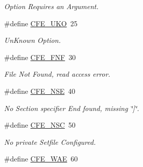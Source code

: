 \begin{CompactItemize}
\begin{CompactList}\small\item\em Option Requires an Argument. \item\end{CompactList}\item 
\hypertarget{group__errors_g77e1698381143e412a7a4796b2b8f564}{
\#define \hyperlink{group__errors_g77e1698381143e412a7a4796b2b8f564}{CFE\_\-UKO}~25}
\label{group__errors_g77e1698381143e412a7a4796b2b8f564}

\begin{CompactList}\small\item\em UnKnown Option. \item\end{CompactList}\item 
\hypertarget{group__errors_ga3d4c51112fd70d482a4a77c95dc3daf}{
\#define \hyperlink{group__errors_ga3d4c51112fd70d482a4a77c95dc3daf}{CFE\_\-FNF}~30}
\label{group__errors_ga3d4c51112fd70d482a4a77c95dc3daf}

\begin{CompactList}\small\item\em File Not Found, read access error. \item\end{CompactList}\item 
\hypertarget{group__errors_ge1f1ad273da29546c89e9e6761b8b3e2}{
\#define \hyperlink{group__errors_ge1f1ad273da29546c89e9e6761b8b3e2}{CFE\_\-NSE}~40}
\label{group__errors_ge1f1ad273da29546c89e9e6761b8b3e2}

\begin{CompactList}\small\item\em No Section specifier End found, missing \char`\"{}\mbox{]}\char`\"{}. \item\end{CompactList}\item 
\hypertarget{group__errors_ge67acd8919ba3a30ca6a6f2857dc3628}{
\#define \hyperlink{group__errors_ge67acd8919ba3a30ca6a6f2857dc3628}{CFE\_\-NSC}~50}
\label{group__errors_ge67acd8919ba3a30ca6a6f2857dc3628}

\begin{CompactList}\small\item\em No private Setfile Configured. \item\end{CompactList}\item 
\hypertarget{group__errors_gd1375fe531ed1c13233e2fa7ae55534f}{
\#define \hyperlink{group__errors_gd1375fe531ed1c13233e2fa7ae55534f}{CFE\_\-WAE}~60}
\label{group__errors_gd1375fe531ed1c13233e2fa7ae55534f}


\end{CompactItemize}
